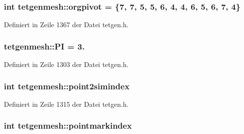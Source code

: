 \hypertarget{classtetgenmesh_a65e14fb4bf9fa6a240a9441ab73bdec5}{
\subsubsection[{orgpivot}]{\setlength{\rightskip}{0pt plus 5cm}int tetgenmesh\-::orgpivot = \{7, 7, 5, 5, 6, 4, 4, 6, 5, 6, 7, 4\}\hspace{0.3cm}{\ttfamily [static]}}}\label{classtetgenmesh_a65e14fb4bf9fa6a240a9441ab73bdec5}


Definiert in Zeile 1367 der Datei tetgen.\-h.

\hypertarget{classtetgenmesh_ad6766e0d2dbbf0a642793fbd6ef98ae2}{
\subsubsection[{P\-I}]{ tetgenmesh\-::\-P\-I = 3.\hspace{0.3cm}{\ttfamily [static]}}}\label{classtetgenmesh_ad6766e0d2dbbf0a642793fbd6ef98ae2}


Definiert in Zeile 1303 der Datei tetgen.\-h.

\hypertarget{classtetgenmesh_aea77ee16cf3d9867922553b4eb740fd0}{
\subsubsection[{point2simindex}]{\setlength{\rightskip}{0pt plus 5cm}int tetgenmesh\-::point2simindex}}\label{classtetgenmesh_aea77ee16cf3d9867922553b4eb740fd0}


Definiert in Zeile 1315 der Datei tetgen.\-h.

\hypertarget{classtetgenmesh_a0da665af737fd8d5db7b7e8d6f97d325}{
\subsubsection[{pointmarkindex}]{\setlength{\rightskip}{0pt plus 5cm}int tetgenmesh\-::pointmarkindex}}\label{classtetgenmesh_a0da665af737fd8d5db7b7e8d6f97d325}


